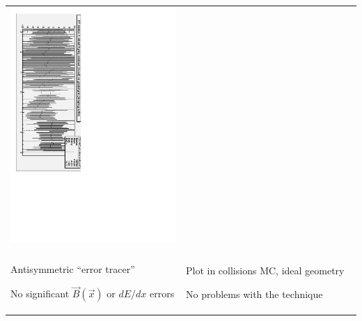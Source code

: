 \documentclass[compress]{beamer}
\begin{document}
\begin{frame}
\begin{tabular}{p{0.5\linewidth} p{0.5\linewidth}}
\vspace{0.01 cm} \includegraphics[height=\linewidth, angle=90]{possible_acoplanarity2.pdf} \\

& \\

Antisymmetric ``error tracer''

\vspace{0.05 cm}
{\scriptsize No significant $\vec{B}(\vec{x})$ or $dE/dx$ errors} & Plot in collisions MC, ideal geometry

\vspace{0.05 cm}
{\scriptsize No problems with the technique} \\


\end{tabular}
\end{frame}
\end{document}
